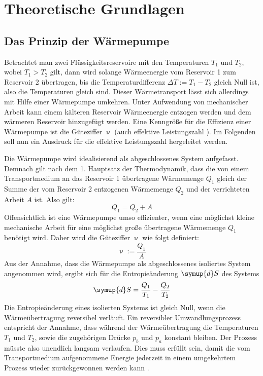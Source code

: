 \section{Theoretische Grundlagen}
\label{sec:Theorie}

\subsection{Das Prinzip der Wärmepumpe}
Betrachtet man zwei Flüssigkeitsreservoire mit den Temperaturen $T_1$ und $T_2$, wobei $T_1 > T_2$ gilt, dann wird solange Wärmeenergie vom Reservoir 1 zum Reservoir 2 übertragen, bis die Temperaturdifferenz $\Delta T := T_1 - T_2$ gleich Null ist, also die Temperaturen gleich sind.
Dieser Wärmetransport lässt sich allerdings mit Hilfe einer Wärmepumpe umkehren. Unter Aufwendung von mechanischer Arbeit kann einem kälteren Reservoir Wärmeenergie entzogen werden und dem wärmeren Reservoir hinzugefügt werden.
Eine Kenngröße für die Effizienz einer Wärmepumpe ist die Güteziffer $\upnu$ (auch effektive Leistungszahl \cite{geschke}). Im Folgenden soll nun ein Ausdruck für die effektive Leistungszahl hergeleitet werden.

Die Wärmepumpe wird idealisierend als abgeschlossenes System aufgefasst.
Demnach gilt nach dem 1. Hauptsatz der Thermodynamik, dass die von einem Transportmedium an das Reservoir 1 übertragene Wärmemenge $Q_1$ gleich der Summe der vom Reservoir 2 entzogenen Wärmemenge $Q_2$ und der verrichteten Arbeit $A$ ist. Also gilt:
\begin{equation}
	\label{eqn:dQ}
	Q_1 = Q_2 + A
\end{equation}
Offensichtlich ist eine Wärmepumpe umso effizienter, wenn eine möglichst kleine mechanische Arbeit für eine möglichst große übertragene Wärmemenge $Q_1$ benötigt wird. Daher wird die Güteziffer $\upnu$ wie folgt definiert:
\begin{equation}
	\label{eqn:guete}
	\upnu := \frac{Q_1}{A}
\end{equation}
Aus der Annahme, dass die Wärmepumpe als abgeschlossenes isoliertes System angenommen wird, ergibt sich für die Entropieänderung $\symup{d}S$ des Systems
\begin{equation}
	\label{eqn:entropie}
	\symup{d}S = \frac{Q_1}{T_1} - \frac{Q_2}{T_2}
\end{equation}
Die Entropieänderung eines isolierten Systems ist gleich Null, wenn die Wärmeübertragung reversibel verläuft. 
Ein reversibler Umwandlungsprozess entspricht der Annahme, dass während der Wärmeübertragung die Temperaturen $T_1$ und $T_2$, sowie die zugehörigen Drücke $p_b$ und $p_a$ konstant bleiben. Der Prozess müsste also unendlich langsam verlaufen. 
Dies muss erfüllt sein, damit die vom Transportmedium aufgenommene Energie jederzeit in einem umgekehrtem Prozess wieder zurückgewonnen werden kann \cite{Anleitung}.

